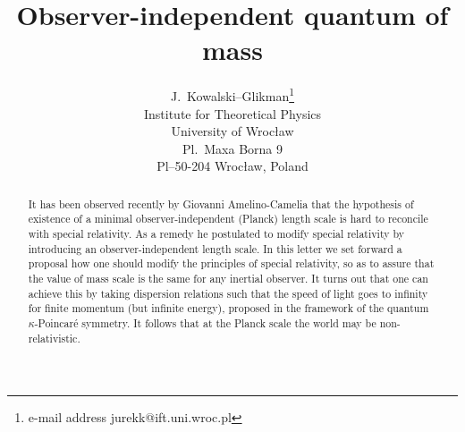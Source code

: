 \documentclass [11pt] {article}
\begin{document}
\title{%
Observer-independent quantum of mass }
\author{ J.\ Kowalski--Glikman\thanks{e-mail
address jurekk@ift.uni.wroc.pl}\\ Institute for Theoretical
Physics\\ University of Wroc\l{}aw\\ Pl.\ Maxa Borna 9\\
Pl--50-204 Wroc\l{}aw, Poland} \maketitle



\begin{abstract}

It has been observed recently by Giovanni Amelino-Camelia
\cite{gac1, gac2} that the hypothesis of existence of a minimal observer-independent
(Planck) length scale is hard to reconcile with special relativity. As a remedy
he postulated to modify special relativity by introducing an
observer-independent length scale. In this letter  we set forward
a proposal how one should modify the principles of special
relativity, so as to assure that the value of mass 
scale is the same for any inertial observer. It turns out that
one can achieve this by taking dispersion relations such that the
speed of light goes to infinity for finite momentum (but infinite
energy), proposed  in the framework of the quantum
$\kappa$-Poincar\'{e} symmetry. It follows that at the Planck scale
the world may be non-relativistic.

\end{abstract}

\clearpage
\end{document}
